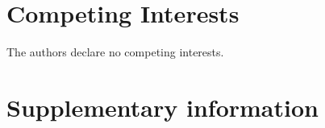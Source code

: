 \documentclass[sn-apa]{sn-jnl}%
\theoremstyle{thmstyleone}%
\theoremstyle{thmstyletwo}%
\theoremstyle{thmstylethree}%
\begin{document}
\section*{Competing Interests}

The authors declare no competing interests.

\section*{Supplementary information}






\printbibliography
\end{document}
